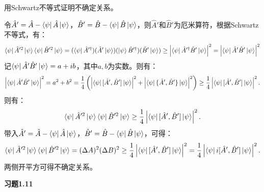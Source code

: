 \documentclass[reqno,a4paper,12pt]{amsart}
\begin{document}
用Schwartz不等式证明不确定关系。
\begin{tcolorbox}[breakable, colback = black!5!white, colframe = black]
令$\hat{A}' = \hat{A} - \bra{\psi}\hat{A}\ket{\psi}$，$\hat{B}' = \hat{B} - \bra{\psi}\hat{B}\ket{\psi}$，则$\hat{A}'$和$\hat{B}'$为厄米算符，根据Schwartz不等式，有：
\[
	\bra{\psi}\hat{A}'^2\ket{\psi}\bra{\psi}\hat{B}'^2\ket{\psi} = (\bra{\psi} \hat{A}'^\dagger)(\hat{A}'\ket{\psi}) (\ket{\psi}\hat{B}'^\dagger)(\hat{B}'\ket{\psi}) \geq \left\vert \bra{\psi} \hat{A}'^\dagger \hat{B}' \ket{\psi} \right\vert^2 = \left\vert \bra{\psi} \hat{A}' \hat{B}' \ket{\psi} \right\vert^2
\]
记$\bra{\psi} \hat{A}' \hat{B}' \ket{\psi} = a+ib$，其中$a,b$为实数。则有：
\[
	\left\vert \bra{\psi} \hat{A}' \hat{B}' \ket{\psi} \right\vert^2 = a^2+b^2 = \frac{1}{4}\left( \left\vert \bra{\psi} [\hat{A}', \hat{B}'] \ket{\psi} \right\vert^2 + \left\vert \bra{\psi} \{\hat{A}', \hat{B}'\} \ket{\psi} \right\vert^2 \right) \geq \frac{1}{4} \left\vert \bra{\psi} [\hat{A}', \hat{B}'] \ket{\psi} \right\vert^2.
\]
则有：
\[
	\bra{\psi}\hat{A}'^2\ket{\psi}\bra{\psi}\hat{B}'^2\ket{\psi} \geq \frac{1}{4} \left\vert \bra{\psi} [\hat{A}', \hat{B}'] \ket{\psi} \right\vert^2.
\]
带入$\hat{A}' = \hat{A} - \bra{\psi}\hat{A}\ket{\psi}$，$\hat{B}' = \hat{B} - \bra{\psi}\hat{B}\ket{\psi}$，可得：
\[
	\bra{\psi}\hat{A}'^2\ket{\psi}\bra{\psi}\hat{B}'^2\ket{\psi} = (\Delta A)^2 (\Delta B)^2 \geq \frac{1}{4} \left\vert \bra{\psi} [\hat{A}', \hat{B}'] \ket{\psi} \right\vert^2 = \frac{1}{4} \left\vert \bra{\psi} i[\hat{A}', \hat{B}'] \ket{\psi} \right\vert^2.
\]
两侧开平方可得不确定关系。
\end{tcolorbox}

\textbf{习题1.11}
\end{document}
